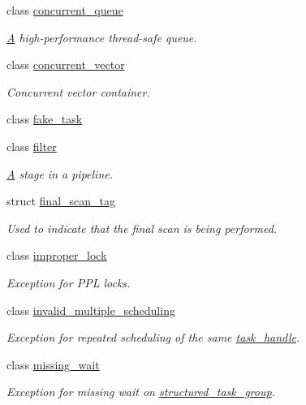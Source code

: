 \begin{DoxyCompactItemize}
class \hyperlink{classtbb_1_1concurrent__queue}{concurrent\+\_\+queue}
\begin{DoxyCompactList}\small\item\em \hyperlink{structA}{A} high-\/performance thread-\/safe queue. \end{DoxyCompactList}\item 
class \hyperlink{classtbb_1_1concurrent__vector}{concurrent\+\_\+vector}
\begin{DoxyCompactList}\small\item\em Concurrent vector container. \end{DoxyCompactList}\item 
class \hyperlink{classtbb_1_1fake__task}{fake\+\_\+task}
\item 
class \hyperlink{classtbb_1_1filter}{filter}
\begin{DoxyCompactList}\small\item\em \hyperlink{structA}{A} stage in a pipeline. \end{DoxyCompactList}\item 
struct \hyperlink{structtbb_1_1final__scan__tag}{final\+\_\+scan\+\_\+tag}
\begin{DoxyCompactList}\small\item\em Used to indicate that the final scan is being performed. \end{DoxyCompactList}\item 
class \hyperlink{classtbb_1_1improper__lock}{improper\+\_\+lock}
\begin{DoxyCompactList}\small\item\em Exception for P\+P\+L locks. \end{DoxyCompactList}\item 
class \hyperlink{classtbb_1_1invalid__multiple__scheduling}{invalid\+\_\+multiple\+\_\+scheduling}
\begin{DoxyCompactList}\small\item\em Exception for repeated scheduling of the same \hyperlink{classtbb_1_1task__handle}{task\+\_\+handle}. \end{DoxyCompactList}\item 
class \hyperlink{classtbb_1_1missing__wait}{missing\+\_\+wait}
\begin{DoxyCompactList}\small\item\em Exception for missing wait on \hyperlink{classtbb_1_1structured__task__group}{structured\+\_\+task\+\_\+group}. \end{DoxyCompactList}\item 

\end{DoxyCompactItemize}
